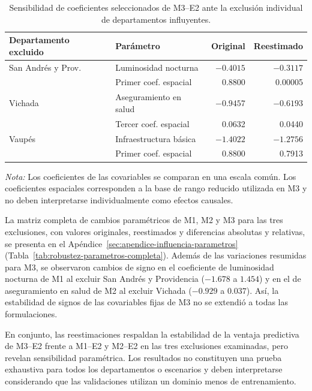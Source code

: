 \begin{table}[!htbp]
\centering
\footnotesize
\caption{Sensibilidad de coeficientes seleccionados de M3--E2 ante la exclusión individual de departamentos influyentes.}
\label{tab:robustez-coeficientes-m3}
\renewcommand{\arraystretch}{1.1}
\setlength{\tabcolsep}{5pt}
\begin{tabular}{l l r r}
\hline
Departamento excluido & Parámetro & Original & Reestimado \\
\hline
San Andrés y Prov. & Luminosidad nocturna & $-0.4015$ & $-0.3117$ \\
                   & Primer coef. espacial & 0.8800 & 0.00005 \\
Vichada            & Aseguramiento en salud & $-0.9457$ & $-0.6193$ \\
                   & Tercer coef. espacial & 0.0632 & 0.0440 \\
Vaupés             & Infraestructura básica & $-1.4022$ & $-1.2756$ \\
                   & Primer coef. espacial & 0.8800 & 0.7913 \\
\hline
\end{tabular}

\vspace{2mm}
\parbox{0.95\linewidth}{\footnotesize
\textit{Nota:} Los coeficientes de las covariables se comparan en una escala común. Los coeficientes espaciales corresponden a la base de rango reducido utilizada en M3 y no deben interpretarse individualmente como efectos causales.}
\end{table}

La matriz completa de cambios paramétricos de M1, M2 y M3 para las tres exclusiones, con valores originales, reestimados y diferencias absolutas y relativas, se presenta en el Apéndice~\ref{sec:apendice-influencia-parametros} (Tabla~\ref{tab:robustez-parametros-completa}). Además de las variaciones resumidas para M3, se observaron cambios de signo en el coeficiente de luminosidad nocturna de M1 al excluir San Andrés y Providencia ($-1.678$ a $1.454$) y en el de aseguramiento en salud de M2 al excluir Vichada ($-0.929$ a $0.037$). Así, la estabilidad de signos de las covariables fijas de M3 no se extendió a todas las formulaciones.

En conjunto, las reestimaciones respaldan la estabilidad de la ventaja predictiva de M3--E2 frente a M1--E2 y M2--E2 en las tres exclusiones examinadas, pero revelan sensibilidad paramétrica. Los resultados no constituyen una prueba exhaustiva para todos los departamentos o escenarios y deben interpretarse considerando que las validaciones utilizan un dominio menos de entrenamiento.


